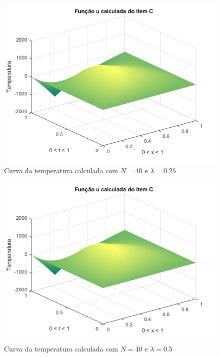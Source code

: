 \documentclass[12pt]{article}
\begin{document}
\begin{spacing}{1.5}
\begin{figure}
    \centering
    \includegraphics[width=0.8\linewidth]{Primeira_Tarefa/ItemC/n40_lambda0-25_calc.png}
    \caption{Curva da temperatura calculada com $N=40$ e $\lambda=0.25$}
    \label{fig:C_n40lambda0-25_calc}
\end{figure}
\begin{figure}
    \centering
    \includegraphics[width=0.8\linewidth]{Primeira_Tarefa/ItemC/n40_lambda0-5_calc.png}
    \caption{Curva da temperatura calculada com $N=40$ e $\lambda=0.5$}
    \label{fig:C_n40lambda0-5_calc}
\end{figure}



\end{spacing}
\end{document}

